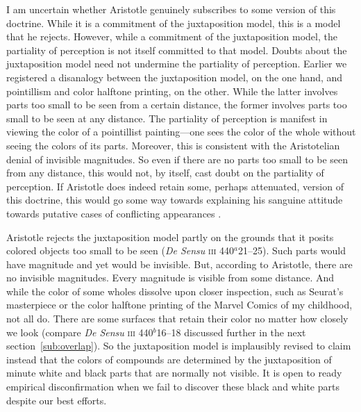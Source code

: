 I am uncertain whether Aristotle genuinely subscribes to some version of this doctrine. While it is a commitment of the juxtaposition model, this is a model that he rejects. However, while a commitment of the juxtaposition model, the partiality of perception is not itself committed to that model. Doubts about the juxtaposition model need not undermine the partiality of perception. Earlier we registered a disanalogy between the juxtaposition model, on the one hand, and pointillism and color halftone printing, on the other. While the latter involves parts too small to be seen from a certain distance, the former involves parts too small to be seen at any distance. The partiality of perception is manifest in viewing the color of a pointillist painting---one sees the color of the whole without seeing the colors of its parts. Moreover, this is consistent with the Aristotelian denial of invisible magnitudes. So even if there are no parts too small to be seen from any distance, this would not, by itself, cast doubt on the partiality of perception. If Aristotle does indeed retain some, perhaps attenuated, version of this doctrine, this would go some way towards explaining his sanguine attitude towards putative cases of conflicting appearances \citep[on how the partiality of perception can help dissipate some appearances of conflict see][]{Kalderon:2006tg}.

Aristotle rejects the juxtaposition model partly on the grounds that it posits colored objects too small to be seen (\emph{De Sensu} \textsc{iii} 440\( ^{a} \)21--25). Such parts would have magnitude and yet would be invisible. But, according to Aristotle, there are no invisible magnitudes. Every magnitude is visible from some distance. And while the color of some wholes dissolve upon closer inspection, such as Seurat's masterpiece or the color halftone printing of the Marvel Comics of my childhood, not all do. There are some surfaces that retain their color no matter how closely we look (compare \emph{De Sensu} \textsc{iii} 440\( ^{b} \)16--18 discussed further in the next section~\ref{sub:overlap}). So the juxtaposition model is implausibly revised to claim instead that the colors of compounds are determined by the juxtaposition of minute white and black parts that are normally not visible. It is open to ready empirical disconfirmation when we fail to discover these black and white parts despite our best efforts.

